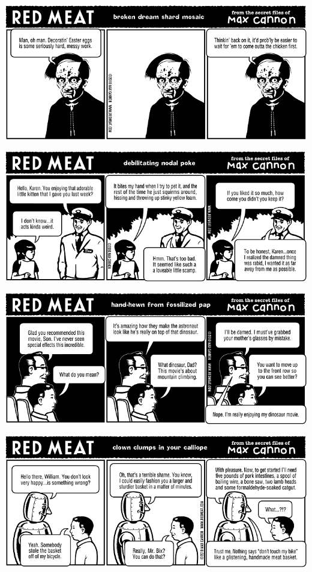 \documentclass[a4paper,twoside,11pt]{article}
\begin{document}
\includegraphics[width=\textwidth]{redmeat_2010-04-06.png}



\includegraphics[width=\textwidth]{redmeat_2010-04-13.png}



\includegraphics[width=\textwidth]{redmeat_2010-04-20.png}



\includegraphics[width=\textwidth]{redmeat_2010-04-27.png}
\end{document}
